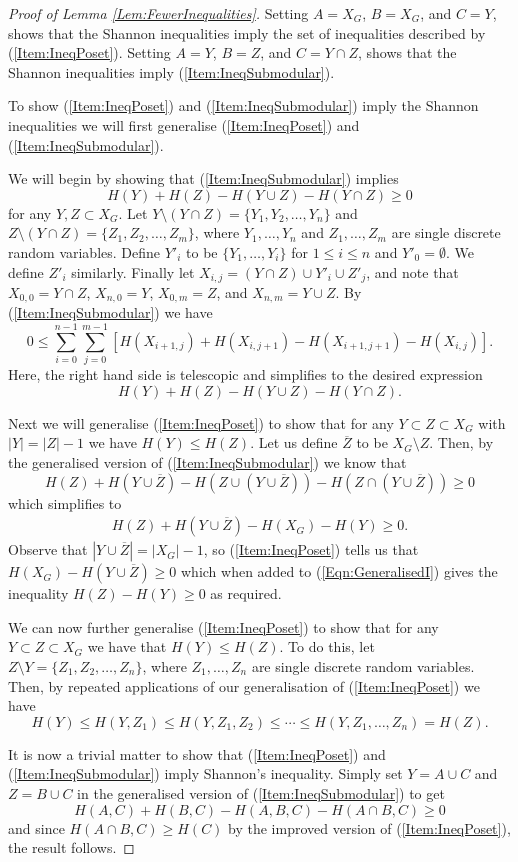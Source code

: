 \documentclass[a4paper, 14pt]{extarticle}
\theoremstyle{plain}
\begin{document}
\begin{proof}[Proof of Lemma \ref{Lem:FewerInequalities}]
Setting $A=X_G$, $B=X_G$, and $C=Y$, shows that the Shannon inequalities
imply the set of inequalities described by (\ref{Item:IneqPoset}).
Setting $A=Y$, $B=Z$, and $C=Y\cap Z$, shows that the Shannon
inequalities imply (\ref{Item:IneqSubmodular}). 

To show (\ref{Item:IneqPoset}) and (\ref{Item:IneqSubmodular}) imply
the Shannon inequalities we will first generalise
(\ref{Item:IneqPoset}) and (\ref{Item:IneqSubmodular}).

We will begin by showing that (\ref{Item:IneqSubmodular}) implies
\[H(Y)+H(Z)-H(Y\cup Z)-H(Y\cap Z)\geq 0\]
for any $Y,Z\subset X_G$.
Let $Y\setminus (Y\cap Z) = \{Y_1,Y_2,\ldots,Y_n\}$ and $Z\setminus
(Y\cap Z) = \{Z_1,Z_2,\ldots,Z_m\}$, where $Y_1,\ldots,Y_n$ and
$Z_1,\ldots,Z_m$ are single discrete random variables. Define $Y'_i$
to be $\{Y_1,\ldots,Y_i\}$ for $1\leq i \leq n$ and $Y'_0 =
\emptyset$. We define $Z'_i$ similarly. Finally let $X_{i,j} =
(Y\cap Z)\cup Y'_i\cup Z'_j$, and note that $X_{0,0} = Y\cap Z$,
$X_{n,0} = Y$, $X_{0,m}=Z$, and $X_{n,m} = Y\cup Z$. By
(\ref{Item:IneqSubmodular}) we have
\[
0\leq
\sum_{i=0}^{n-1}\sum_{j=0}^{m-1}[H(X_{i+1,j})+H(X_{i,j+1})-H(X_{i+1,j+1})-H(X_{i,j})].
\]
Here, the right hand side is telescopic and simplifies to the desired expression
\[H(Y)+H(Z)-H(Y\cup Z)-H(Y\cap Z).\]

Next we will generalise (\ref{Item:IneqPoset}) to show that for any $Y\subset Z \subset X_G$ with $|Y| = |Z|-1$ we have $H(Y) \leq H(Z)$. Let us define $\overline{Z}$ to be $X_G\setminus Z$. Then, by the generalised version of (\ref{Item:IneqSubmodular}) we know that
\[
H(Z) + H(Y \cup \overline{Z}) - H(Z \cup (Y\cup\overline{Z})) - H(Z \cap (Y\cup\overline{Z})) \geq 0
\]
which simplifies to
\begin{align}\label{Eqn:GeneralisedI}
H(Z) + H(Y \cup \overline{Z}) - H(X_G) - H(Y) \geq 0.
\end{align}
Observe that $|Y\cup\overline{Z}| = |X_G|-1$, so (\ref{Item:IneqPoset}) tells us that $H(X_G)-H(Y\cup\overline{Z})\geq 0$ which when added to (\ref{Eqn:GeneralisedI}) gives the inequality $H(Z)-H(Y)\geq 0$ as required.

We can now further generalise (\ref{Item:IneqPoset}) to show that for any
$Y\subset Z\subset X_G$ we have that $H(Y)\leq H(Z)$. To do this, let
$Z\setminus Y = \{Z_1,Z_2,\ldots,Z_n\}$, where $Z_1,\ldots,Z_n$ are
single discrete random variables. Then, by repeated applications of our generalisation of (\ref{Item:IneqPoset}) we have
\[
H(Y)\leq H(Y,Z_1)\leq H(Y,Z_1,Z_2)\leq \cdots \leq
H(Y,Z_1,\ldots,Z_n) = H(Z).
\]

It is now a trivial matter to show that (\ref{Item:IneqPoset}) and
(\ref{Item:IneqSubmodular}) imply Shannon's inequality. Simply set
$Y=A\cup C$ and $Z=B\cup C$ in the generalised version of
(\ref{Item:IneqSubmodular}) to get
\[
H(A,C)+H(B,C)-H(A,B,C)-H(A\cap B, C)\geq 0
\]
and since $H(A\cap B, C)\geq H(C)$ by the improved version of
(\ref{Item:IneqPoset}), the result follows.
\end{proof}
\end{document}
